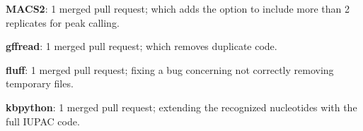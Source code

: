 \noindent
\textbf{MACS2}: 1 merged pull request; which adds the option to include more than 2 replicates for peak calling.
\newline

\noindent
\textbf{gffread}: 1 merged pull request; which removes duplicate code.
\newline

\noindent
\textbf{fluff}: 1 merged pull request; fixing a bug concerning not correctly removing temporary files.
\newline

\noindent
\textbf{kbpython}: 1 merged pull request; extending the recognized nucleotides with the full IUPAC code.
\newline


\newpage